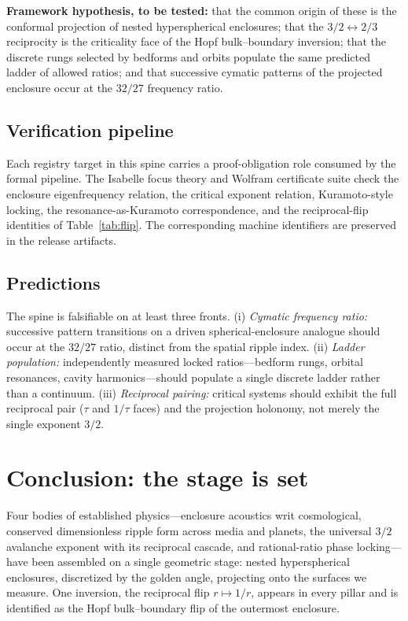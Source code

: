 \documentclass[11pt]{article}
\theoremstyle{remark}
\begin{document}
\textbf{Framework hypothesis, to be tested:} that the common origin of these is the conformal projection of nested hyperspherical enclosures; that the $3/2 \leftrightarrow 2/3$ reciprocity is the criticality face of the Hopf bulk--boundary inversion; that the discrete rungs selected by bedforms and orbits populate the same predicted ladder of allowed ratios; and that successive cymatic patterns of the projected enclosure occur at the $32/27$ frequency ratio.

\subsection{Verification pipeline}

Each registry target in this spine carries a proof-obligation role consumed by the formal pipeline. The Isabelle focus theory and Wolfram certificate suite check the enclosure eigenfrequency relation, the critical exponent relation, Kuramoto-style locking, the resonance-as-Kuramoto correspondence, and the reciprocal-flip identities of Table~\ref{tab:flip}. The corresponding machine identifiers are preserved in the release artifacts.

\subsection{Predictions}

The spine is falsifiable on at least three fronts. (i) \emph{Cymatic frequency ratio:} successive pattern transitions on a driven spherical-enclosure analogue should occur at the $32/27$ ratio, distinct from the spatial ripple index. (ii) \emph{Ladder population:} independently measured locked ratios---bedform rungs, orbital resonances, cavity harmonics---should populate a single discrete ladder rather than a continuum. (iii) \emph{Reciprocal pairing:} critical systems should exhibit the full reciprocal pair ($\tau$ and $1/\tau$ faces) and the projection holonomy, not merely the single exponent $3/2$.

\section{Conclusion: the stage is set}
\label{sec:conclusion}

Four bodies of established physics---enclosure acoustics writ cosmological, conserved dimensionless ripple form across media and planets, the universal $3/2$ avalanche exponent with its reciprocal cascade, and rational-ratio phase locking---have been assembled on a single geometric stage: nested hyperspherical enclosures, discretized by the golden angle, projecting onto the surfaces we measure. One inversion, the reciprocal flip $r \mapsto 1/r$, appears in every pillar and is identified as the Hopf bulk--boundary flip of the outermost enclosure.
\end{document}
